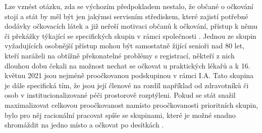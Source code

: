 
Lze vznést otázku, zda se výchozím předpokladem nestalo, že občané o očkování stojí a stát by měl být jen jakýmsi servisním střediskem, které zajistí potřebné dodávky očkovacích látek a již neřeší motivaci občanů k očkování, přístup k němu \cite{logoc_zpozdeni} či překážky týkající se specifických skupin v rámci společnosti \cite{logoc_skvrny,logoc_romove}. %
Jednou ze skupin vyžadujících osobnější přístup mohou být samostatně žijící senioři nad 80 let, kteří naráželi na obtížně překonatelné problémy s registrací, někteří z nich dlouhou dobu čekali na možnost nechat se očkovat u praktických lékařů a k 16. květnu 2021 jsou nejméně proočkovanou podskupinou v rámci I.A. Tato skupina je dále specifická tím, že jsou její členové na rozdíl například od zdravotníků či osob v institucionalizované péči prostorově rozptýleni. Pokud se stát snažil maximalizovat celkovou proočkovanost namísto proočkovanosti prioritních skupin, bylo pro něj racionální pracovat spíše se skupinami, které je možné snadno shromáždit na jedno místo a očkovat po desítkách \cite{blog_ucitele}.  









